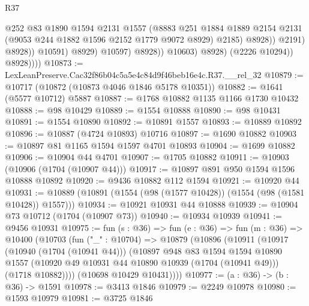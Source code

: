 \begin{lexlean}{R37}
\begin{coremodule}
                                      @252
                                      @83
                                      @1890
                                      @1594
                                      @2131
                                      @1557
                                      (@8883
                                        @251
                                        @1884
                                        @1889
                                        @2154
                                        @2131
                                        (@9053 @244 @1882 @1596 @2152 @1779 @9072 @8929)
                                        @2185)
                                      @8928))
                                  @2191)
                                @8928))
                            @10591)
                          @8929)
                        @10597)
                      @8928))
                  @10603)
                @8928)
              (@2226 @10294))
            @8928))))
@10873 := LexLeanPreserve.Cac32f86b04c5a5e4c84d9f46beb16e4c.R37.__rel_32
@10879 := @10717 (@10872 (@10873 @4046 @1846 @5178 @10351))
@10882 := @1641 (@5577 @10712) @5887
@10887 := @1768 @10882 @1135 @1166 @1730 @10432
@10888 := @98 @10429
@10889 := @1554 @10888
@10890 := @98 @10431
@10891 := @1554 @10890
@10892 := @10891 @1557
@10893 := @10889 @10892
@10896 := @10887 (@4724 @10893) @10716
@10897 := @1690 @10882
@10903 := @10897 @81 @1165 @1594 @1597 @4701 @10893
@10904 := @1699 @10882
@10906 := @10904 @44 @4701
@10907 := @1705 @10882
@10911 := @10903 (@10906 (@1704 (@10907 @44)))
@10917 := @10897 @891 @950 @1594 @1596 @10888 @10892
@10920 := @9436 @10882 @112 @1594
@10921 := @10920 @44
@10931 := @10889 (@10891 (@1554 (@98 (@1577 @10428)) (@1554 (@98 (@1581 @10428)) @1557)))
@10934 := @10921 @10931 @44 @10888
@10939 := @10904 @73 @10712 (@1704 (@10907 @73))
@10940 := @10934 @10939
@10941 := @9456 @10931
@10975 := fun (s : @36) =>
  fun (e : @36) =>
  fun (m : @36) =>
  @10400
    (@10703
      (fun ("_" : @10704) =>
      @10879
        (@10896
          (@10911
            (@10917
              (@10940 (@1704 (@10941 @44)))
              (@10897
                @948
                @83
                @1594
                @1594
                @10890
                @1557
                (@10920 @49 @10931 @44 @10890 @10939 (@1704 (@10941 @49)))
                (@1718 @10882))))
          (@10698 @10429 @10431))))
@10977 := (a : @36) -> (b : @36) -> @1591
@10978 := @3413 @1846
@10979 := @2249 @10978
@10980 := @1593 @10979
@10981 := @3725 @1846

\end{coremodule}
\end{lexlean}
